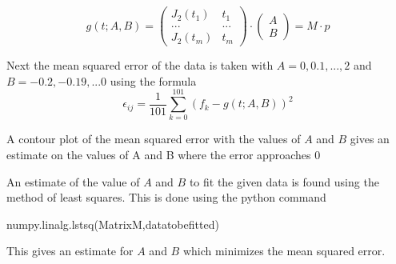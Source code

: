 \documentclass[12pt, a4paper]{report}
\begin{document}
\begin{equation}\label{eq:3}
g(t;A,B)=
\begin{pmatrix}
J_{2}(t_{1}) & t_{1}\\
... & ... \\
J_{2}(t_{m}) & t_{m}
\end{pmatrix}
\cdot
\begin{pmatrix}
A\\B
\end{pmatrix}
=M\cdot p
\end{equation}

Next the mean squared error of the data is taken with $A = 0,0.1,...,2$ and $B = -0.2,-0.19,...0$ using the formula
\begin{equation}\label{eq:4}
\epsilon_{ij}=\frac{1}{101}\sum_{k=0}^{101}\left(f_{k}-g(t;A,B)\right)^{2}
\end{equation} 
 
A contour plot of the mean squared error with the values of $A$ and $B$ gives an estimate on the values of A and B where the error approaches 0

An estimate of the value of $A$ and $B$ to fit the given data is found using the method of least squares. This is done using the python command

\begin{psudo}
numpy.linalg.lstsq(MatrixM,datatobefitted)
\end{psudo}

This gives an estimate for $A$ and $B$ which minimizes the mean squared error.
\end{document}
